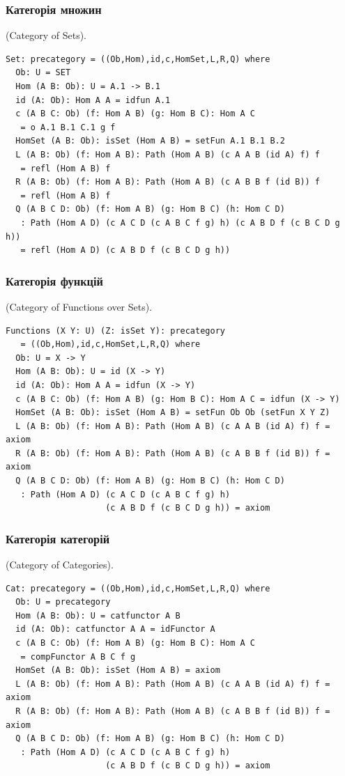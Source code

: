 \begin{definition}
\subsubsection{Категорія множин}
\begin{definition} (Category of Sets).
\begin{lstlisting}
Set: precategory = ((Ob,Hom),id,c,HomSet,L,R,Q) where
  Ob: U = SET
  Hom (A B: Ob): U = A.1 -> B.1
  id (A: Ob): Hom A A = idfun A.1
  c (A B C: Ob) (f: Hom A B) (g: Hom B C): Hom A C
   = o A.1 B.1 C.1 g f
  HomSet (A B: Ob): isSet (Hom A B) = setFun A.1 B.1 B.2
  L (A B: Ob) (f: Hom A B): Path (Hom A B) (c A A B (id A) f) f
   = refl (Hom A B) f
  R (A B: Ob) (f: Hom A B): Path (Hom A B) (c A B B f (id B)) f
   = refl (Hom A B) f
  Q (A B C D: Ob) (f: Hom A B) (g: Hom B C) (h: Hom C D)
   : Path (Hom A D) (c A C D (c A B C f g) h) (c A B D f (c B C D g h))
   = refl (Hom A D) (c A B D f (c B C D g h))
\end{lstlisting}
\end{definition}

\subsubsection{Категорія функцій}
\begin{definition} (Category of Functions over Sets).
\begin{lstlisting}
Functions (X Y: U) (Z: isSet Y): precategory
   = ((Ob,Hom),id,c,HomSet,L,R,Q) where
  Ob: U = X -> Y
  Hom (A B: Ob): U = id (X -> Y)
  id (A: Ob): Hom A A = idfun (X -> Y)
  c (A B C: Ob) (f: Hom A B) (g: Hom B C): Hom A C = idfun (X -> Y)
  HomSet (A B: Ob): isSet (Hom A B) = setFun Ob Ob (setFun X Y Z)
  L (A B: Ob) (f: Hom A B): Path (Hom A B) (c A A B (id A) f) f = axiom
  R (A B: Ob) (f: Hom A B): Path (Hom A B) (c A B B f (id B)) f = axiom
  Q (A B C D: Ob) (f: Hom A B) (g: Hom B C) (h: Hom C D)
   : Path (Hom A D) (c A C D (c A B C f g) h)
                    (c A B D f (c B C D g h)) = axiom
\end{lstlisting}
\end{definition}

\subsubsection{Категорія категорій}
\begin{definition} (Category of Categories).
\begin{lstlisting}
Cat: precategory = ((Ob,Hom),id,c,HomSet,L,R,Q) where
  Ob: U = precategory
  Hom (A B: Ob): U = catfunctor A B
  id (A: Ob): catfunctor A A = idFunctor A
  c (A B C: Ob) (f: Hom A B) (g: Hom B C): Hom A C
   = compFunctor A B C f g
  HomSet (A B: Ob): isSet (Hom A B) = axiom
  L (A B: Ob) (f: Hom A B): Path (Hom A B) (c A A B (id A) f) f = axiom
  R (A B: Ob) (f: Hom A B): Path (Hom A B) (c A B B f (id B)) f = axiom
  Q (A B C D: Ob) (f: Hom A B) (g: Hom B C) (h: Hom C D)
   : Path (Hom A D) (c A C D (c A B C f g) h)
                    (c A B D f (c B C D g h)) = axiom
\end{lstlisting}
\end{definition}


\end{definition}
